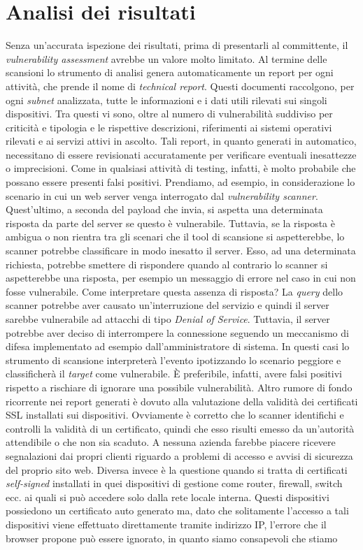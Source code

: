 \documentclass[target=mst,aauheader=]{thud}
\begin{document}
\section{Analisi dei risultati}
Senza un’accurata ispezione dei risultati, prima di presentarli al committente, il \textit{vulnerability assessment} avrebbe un valore molto limitato. Al termine delle scansioni lo strumento di analisi genera automaticamente un report per ogni attività, che prende il nome di \textit{technical report}. Questi documenti raccolgono, per ogni \textit{subnet} analizzata, tutte le informazioni e i dati utili rilevati sui singoli dispositivi. Tra questi vi sono, oltre al numero di vulnerabilità suddiviso per criticità e tipologia e le rispettive descrizioni, riferimenti ai sistemi operativi rilevati e ai servizi attivi in ascolto. Tali report, in quanto generati in automatico, necessitano di essere revisionati accuratamente per verificare eventuali inesattezze o imprecisioni. Come in qualsiasi attività di testing, infatti, è molto probabile che possano essere presenti falsi positivi. Prendiamo, ad esempio, in considerazione lo scenario in cui un web server venga interrogato dal \textit{vulnerability scanner}. Quest’ultimo, a seconda del payload che invia, si aspetta una determinata risposta da parte del server se questo è vulnerabile. Tuttavia, se la risposta è ambigua o non rientra tra gli scenari che il tool di scansione si aspetterebbe, lo scanner potrebbe classificare in modo inesatto il server. Esso, ad una determinata richiesta, potrebbe smettere di rispondere quando al contrario lo scanner si aspetterebbe una risposta, per esempio un messaggio di errore nel caso in cui non fosse vulnerabile. Come interpretare questa assenza di risposta? La \textit{query} dello scanner potrebbe aver causato un’interruzione del servizio e quindi il server sarebbe vulnerabile ad attacchi di tipo \textit{Denial of Service}. Tuttavia, il server potrebbe aver deciso di interrompere la connessione seguendo un meccanismo di difesa implementato ad esempio dall’amministratore di sistema. In questi casi lo strumento di scansione interpreterà l’evento ipotizzando lo scenario peggiore e classificherà il \textit{target} come vulnerabile. È preferibile, infatti, avere falsi positivi rispetto a rischiare di ignorare una possibile vulnerabilità. Altro rumore di fondo ricorrente nei report generati è dovuto alla valutazione della validità dei certificati SSL installati sui dispositivi. Ovviamente è corretto che lo scanner identifichi e controlli la validità di un certificato, quindi che esso risulti emesso da un’autorità attendibile o che non sia scaduto. A nessuna azienda farebbe piacere ricevere segnalazioni dai propri clienti riguardo a problemi di accesso e avvisi di sicurezza del proprio sito web. Diversa invece è la questione quando si tratta di certificati \textit{self-signed} installati in quei dispositivi di gestione come router, firewall, switch ecc. ai quali si può accedere solo dalla rete locale interna. Questi dispositivi possiedono un certificato auto generato ma, dato che solitamente l’accesso a tali dispositivi viene effettuato direttamente tramite indirizzo IP, l’errore che il browser propone può essere ignorato, in quanto siamo consapevoli che stiamo 
\end{document}
